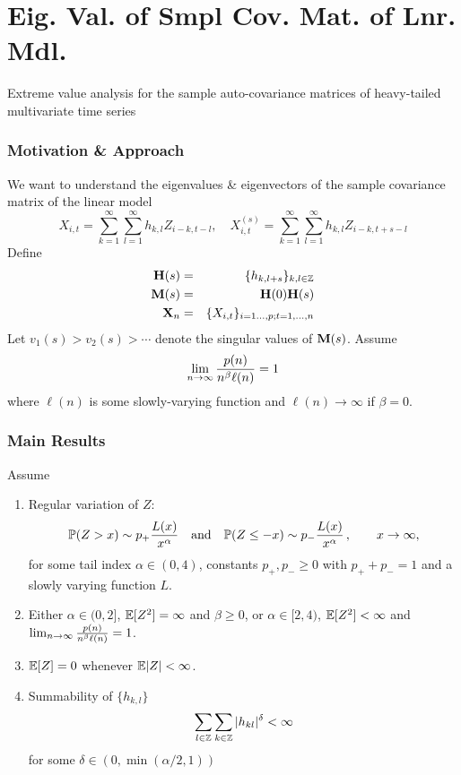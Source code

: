 \documentclass{beamer}
\begin{document}
\section{Eig. Val. of Smpl Cov. Mat. of Lnr. Mdl.}
\begin{frame}
  Extreme value analysis for the sample auto-covariance matrices of
  heavy-tailed multivariate time series
\end{frame}

\begin{frame}
  \frametitle{Motivation \& Approach}
  We want to understand the eigenvalues \& eigenvectors of the sample
  covariance matrix of the linear model
  \[
  X_{i,t} = \sum_{k=1}^\infty \sum_{l=1}^\infty h_{k ,l} Z_{i-k, t-l},
  \quad
  X_{i,t}^{(s)} = \sum_{k=1}^\infty \sum_{l=1}^\infty h_{k ,l} Z_{i-k, t+s-l}
  \]
  Define
  \begin{eqnarray*}
    \mtx H(s) &=& \{h_{k,l+s}\}_{k,l \in \integers} \\
    \mtx M(s) &=& \mtx H(0) \mtx H(s) \\
    \mtx X_n &=& \{X_{i,t}\}_{i=1\dots,p; t=1,\dots,n}
  \end{eqnarray*}
  Let $v_1(s) > v_2(s) > \cdots$ denote the
  singular values of $\mtx M(s)$.
  Assume
  \[
  \lim_{n \to \infty} {p(n) \over n^\beta \ell(n)} = 1
  \]
  where $\ell(n)$ is some slowly-varying function and $\ell(n) \to \infty$
  if $\beta = 0$.
\end{frame}

\begin{frame}
  \frametitle{Main Results}
  Assume
  \begin{scriptsize}
    \begin{enumerate}
    \item Regular variation of $Z$:
      \begin{equation*}
        \P(Z>x)\sim p_+ \dfrac{L(x)}{x^{\alpha}}\quad\mbox{and}\quad  \P(Z\le -x)\sim p_-
        \dfrac{L(x)}{x^{\alpha}}\,,\qquad x \to \infty,
      \end{equation*}
      for some tail index $\alpha \in (0, 4)$, constants $p_+,p_-\ge 0$ with
      $p_++p_-=1$ and a slowly varying function $L$.
    \item Either $\alpha \in (0,2]$, $\E[Z^2]=\infty$ and $\beta \ge 0$,
      or $\alpha \in [2,4)$, $\E[Z^2]<\infty$ and
      $\lim_{n \to \infty} {p(n) \over n^\beta \ell(n)} = 1$.
    \item $\E[Z]=0$ whenever $\E |Z| <\infty$.
    \item Summability of $\{h_{k,l}\}$
      \begin{equation*}
        \sum_{l \in \integers} \sum_{k\in \integers} |h_{kl}|^{\delta} <\infty
      \end{equation*}
      for some $\delta\in (0,\min({\alpha/2},1))$
    \end{enumerate}
  \end{scriptsize}
\end{frame}
\end{document}
